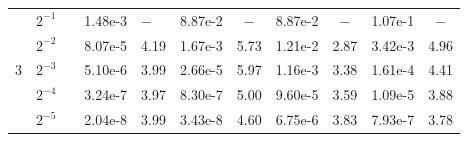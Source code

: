 \documentclass[10pt,letterpaper]{amsart}
\theoremstyle{plain} %
\theoremstyle{remark} %
\begin{document}
\begin{table}[htbp!]
\begin{tabular}{@{\hskip .1in}ccl@{\hskip .1in}cl@{\hskip .1in}cc@{\hskip .1in}cc@{\hskip .1in}cc}
\midrule
\multirow{5}{*}{3}
& $2^{-1}$   & & 1.48e-3 & $-$  & 8.87e-2 & $-$  & 8.87e-2 & $-$  &	1.07e-1 & $-$ \\
& $2^{-2}$   & & 8.07e-5 & 4.19	& 1.67e-3 &	5.73 & 1.21e-2 & 2.87 &	3.42e-3 & 4.96 \\
& $2^{-3}$   & & 5.10e-6 & 3.99	& 2.66e-5 &	5.97 & 1.16e-3 & 3.38 &	1.61e-4 & 4.41 \\
& $2^{-4}$   & & 3.24e-7 & 3.97 & 8.30e-7 &	5.00 & 9.60e-5 & 3.59 &	1.09e-5 & 3.88 \\
& $2^{-5}$   & & 2.04e-8 & 3.99 & 3.43e-8 &	4.60 & 6.75e-6 & 3.83 &	7.93e-7	& 3.78 \\
\bottomrule
\end{tabular}
\label{tab:Ex1}
\end{table}



%

\end{document}
